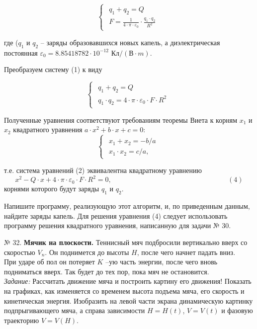 {\begin{equation}
 \begin{cases}
 \begin{aligned}
   q_1 + q_2 = Q\\
   F = \frac{1}{4\cdot\pi\cdot\varepsilon_0}\cdot\frac{q_1\cdot q_2}{R^2}
   \end{aligned}
 \end{cases}
\end{equation}

где ($q_1$ и $q_2$ -- заряды образовавшихся новых капель, 
а диэлектрическая постоянная
 $\varepsilon_0=8.85418782\cdot 10^{-12}$ $\text{Кл}/(\text{В}\cdot m).$

Преобразуем систему (1) к виду  

\begin{equation}
 \begin{cases}
 \begin{aligned}
   q_1 + q_2 = Q\\
   q_1\cdot q_2 = {4\cdot\pi\cdot\varepsilon_0}\cdot F\cdot R^2
      \end{aligned}
 \end{cases}
\end{equation}

Полученные уравнения соответствуют требованиям теоремы Виета к корням $x_1$ и $x_2$ квадратного уравнения 
$a\cdot x^2 + b\cdot x +c = 0:$
\begin{equation}
 \begin{cases}
  \begin{aligned}
   x_1 + x_2 = -b/a\\
   x_1\cdot x_2 = c/a, 
      \end{aligned}
 \end{cases}
\end{equation}

т.е. система уравнений (2) эквивалентна квадратному уравнению
$$x^2 - Q\cdot x + 4\cdot\pi\cdot\varepsilon_0\cdot F\cdot R^2 = 0,  \hspace{200pt} (4)$$
    корнями которого будут заряды $q_1$ и $q_2$.
 
Напишите программу, реализующую этот алгоритм, и, по приведенным данным, найдите заряды капель. Для решения уравнения (4) следует использовать программу решения квадратного уравнения, написанную для задачи № 30.

№ 32. {\bf Мячик на плоскости.}
Теннисный мяч подбросили вертикально вверх со скоростью $V_n$. Он поднимется до высоты $H$, после чего начнет падать вниз.\\
При ударе об пол он потеряет $K$ --ую часть энергии, после чего вновь подниматься вверх. Так будет до тех пор, пока мяч не остановится.\\
{\em Задание:} Рассчитать движение мяча и построить картину его движения! Показать на графиках, как изменяется со временем высота подъема мяча, его скорость и кинетическая энергия. Изобразить на левой части экрана динамическую картинку подпрыгивающего мяча, а справа зависимости  $H= H(t)$, $V= V(t)$ и фазовую траекторию $V= V(H)$.

}
